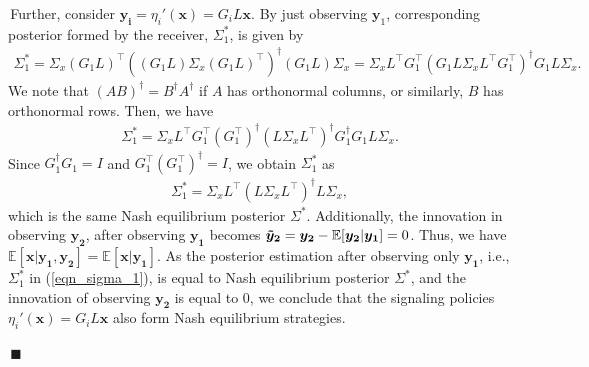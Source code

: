 \documentclass[12pt,journal,onecolumn]{IEEEtran}
\newenvironment{Proof}[1]{\medskip\par\noindent{\bf Proof:\,}\,#1}{{\mbox{\,$\blacksquare$}\par}}
\begin{document}
\begin{Proof}
Further, consider $\boldsymbol{y_i} = \eta_i'(\boldsymbol{x}) =G_i L\boldsymbol{x}$. By just observing $\boldsymbol{y}_1$, corresponding posterior formed by the receiver, $\Sigma_1^*$, is given by
\begin{align}
    \Sigma_1^*= \Sigma_x(G_1 L)^\top((G_1 L)\Sigma_x(G_1 L)^\top)^{\dagger}(G_1 L)\Sigma_x= \Sigma_x  L^\top G_1^\top(G_1 L\Sigma_x L^\top G_1^\top)^{\dagger}G_1 L\Sigma_x.
\end{align}
We note that $(AB)^{\dagger} = B^{\dagger}A^{\dagger}$ if $A$ has orthonormal columns, or similarly, $B$ has orthonormal rows. Then, we have
\begin{align}
    \Sigma_1^*= \Sigma_x  L^\top G_1^\top (G_1^\top)^{\dagger}( L\Sigma_x L^\top )^{\dagger}G_1^{\dagger}G_1 L\Sigma_x.
\end{align}
Since $G_1^{\dagger}G_1= I$ and $G_1^\top (G_1^\top)^{\dagger}=I$, we obtain $\Sigma_1^*$ as
\begin{align}\label{eqn_sigma_1}
    \Sigma_1^*= \Sigma_x  L^\top ( L\Sigma_x L^\top )^{\dagger} L\Sigma_x,
\end{align}
which is the same Nash equilibrium posterior $\Sigma^*$. Additionally, the innovation in observing $\boldsymbol{y_2}$, after observing $\boldsymbol{y_1}$ becomes $\boldsymbol{\Tilde{y}_2}=\boldsymbol{y_2}-\mathbb{E}[\boldsymbol{y_2}|\boldsymbol{y_1}]=0$. %
Thus, we have $\mathbb{E}[\boldsymbol{x}|\boldsymbol{y_1},\boldsymbol{y_2}] =\mathbb{E}[\boldsymbol{x}|\boldsymbol{y_1}]$. As the posterior estimation after observing only $\boldsymbol{y_1}$, i.e., $\Sigma_1^*$ in (\ref{eqn_sigma_1}), is equal to Nash equilibrium posterior $\Sigma^*$, and the innovation of observing $\boldsymbol{y_2}$ is equal to 0, we conclude that the signaling policies $\eta_i'(\boldsymbol{x})=G_i L\boldsymbol{x}$ also form Nash equilibrium strategies.   
\end{Proof}
\end{document}
